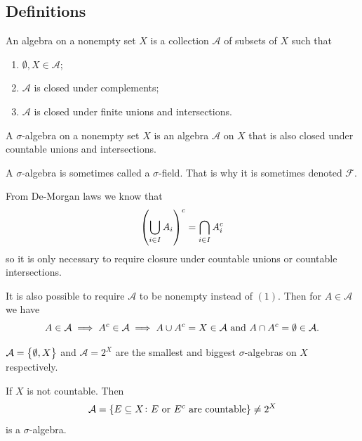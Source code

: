 \documentclass[11pt,a4paper]{article}
\newcommand{\A}{\mathcal A}
\begin{document}
\subsection{Definitions}

\begin{definition}[Algebra]
  An algebra on a nonempty set $X$ is a collection $\mathcal A$ of
  subsets of $X$ such that
  \begin{enumerate}
    \item[(1)] $\emptyset, X \in \mathcal A$;
    \item[(2)] $\mathcal A$ is closed under complements;
    \item[(3)] $\mathcal A$ is closed under finite unions and intersections.
  \end{enumerate}
\end{definition}

\begin{definition}
  A $\sigma$-algebra on a nonempty set $X$ is an algebra $\mathcal A$ on
  $X$ that is also closed under countable unions and intersections.
\end{definition}

\begin{remark}
  A $\sigma$-algebra is sometimes called a $\sigma$-field.
  That is why it is sometimes denoted $\mathcal F$.
\end{remark}

\begin{remark}
  From De-Morgan laws we know that
  \[
    \del{\bigcup_{i \in I} A_i}^c =
    \bigcap_{i \in I} A_i^c
  \]
  so it is only necessary to require closure under countable unions
  or countable intersections.
\end{remark}

\begin{remark}
  It is also possible to require $\mathcal A$ to be nonempty instead of 
  $(1)$.
  Then for $A \in \mathcal A$ we have
  \[
    A \in \A \implies A^c \in \A \implies
    A \cup A^c = X \in \A \stand
    A \cap A^c = \emptyset \in \A.
  \]
\end{remark}

\begin{example}
  $\A = \set{\emptyset, X}$ and $\A = 2^X$ are the smallest
  and biggest $\sigma$-algebras on $X$ respectively.
\end{example}

\begin{example}
  If $X$ is not countable.
  Then
  \[
    \mathcal A =
    \left\{E \subseteq X \colon E \text{ or } E^c \text{ are countable}\right\} \neq
    2^X
  \]
  is a $\sigma$-algebra.
\end{example}
\end{document}
